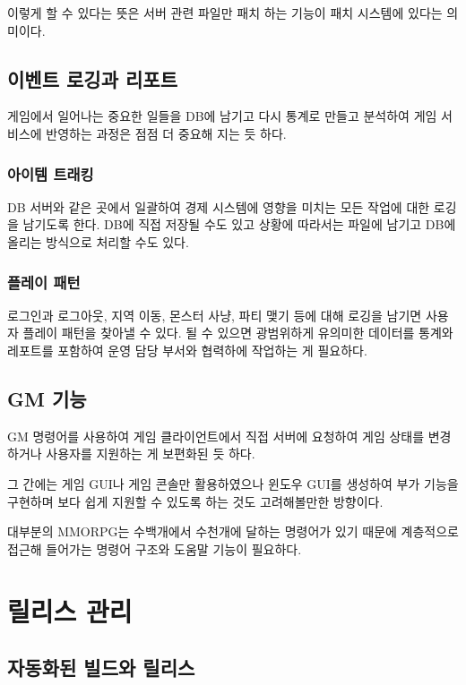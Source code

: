 \documentclass[chapter,kosection, 10.5pt, romanfixed, a4paper]{oblivoir}
\begin{document}
이렇게 할 수 있다는 뜻은 서버 관련 파일만 패치 하는 기능이 패치 시스템에 있다는 의미이다. 

\subsection{이벤트 로깅과 리포트}

게임에서 일어나는 중요한 일들을 DB에 남기고 다시 통계로 만들고 분석하여 
게임 서비스에 반영하는 과정은 점점 더 중요해 지는 듯 하다. 

\subsubsection{아이템 트래킹}

DB 서버와 같은 곳에서 일괄하여 경제 시스템에 영향을 미치는 모든 작업에 대한 
로깅을 남기도록 한다. DB에 직접 저장될 수도 있고 상황에 따라서는 파일에 남기고 
DB에 올리는 방식으로 처리할 수도 있다. 

\subsubsection{플레이 패턴}

로그인과 로그아웃, 지역 이동, 몬스터 사냥, 파티 맺기 등에 대해 로깅을 
남기면 사용자 플레이 패턴을 찾아낼 수 있다. 될 수 있으면 광범위하게 
유의미한 데이터를 통계와 레포트를 포함하여 운영 담당 부서와 협력하에
작업하는 게 필요하다. 

\subsection{GM 기능}

GM 명령어를 사용하여 게임 클라이언트에서 직접 서버에 요청하여 
게임 상태를 변경하거나 사용자를 지원하는 게 보편화된 듯 하다. 

그 간에는 게임 GUI나 게임 콘솔만 활용하였으나 윈도우 GUI를 
생성하여 부가 기능을 구현하며 보다 쉽게 지원할 수 있도록 하는 것도 
고려해볼만한 방향이다. 

대부분의 MMORPG는 수백개에서 수천개에 달하는 명령어가 있기 때문에 
계층적으로 접근해 들어가는 명령어 구조와 도움말 기능이 필요하다. 


\section{릴리스 관리}

\subsection{자동화된 빌드와 릴리스}
\end{document}
